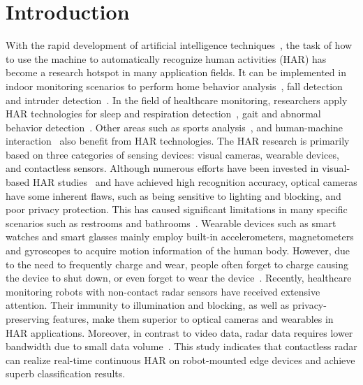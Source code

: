 \section{Introduction}
{W}{ith} the rapid development of artificial intelligence techniques~\cite{wang2019indoor,ali2023new,gu2022strokepeo,zhang2021rethinking,gu2024automatic}, the task of how to use the machine to automatically recognize human activities (HAR) has become a research hotspot in many application fields. It can be implemented in indoor monitoring scenarios to perform home behavior analysis~\cite{arab2022convolutional}, fall detection~\cite{jin2022mmfall} and intruder detection~\cite{ali2023new, rambabu2019iot}. 
In the field of healthcare monitoring, researchers apply HAR technologies for sleep and respiration detection~\cite{khan2017deep,zhao2020heart}, gait and abnormal behavior detection~\cite{hannink2016sensor}. 
Other areas such as sports analysis~\cite{hsu2018human}, and human-machine interaction~\cite{reily2018skeleton} also benefit from HAR technologies. 
The HAR research is primarily based on three categories of sensing devices: visual cameras, wearable devices, and contactless sensors. 
Although numerous efforts have been invested in visual-based HAR studies~\cite{singh2019human} and have achieved high recognition accuracy, optical cameras have some inherent flaws, such as being sensitive to lighting and blocking, and poor privacy protection. This has caused significant limitations in many specific scenarios such as restrooms and bathrooms~\cite{gurbuz2019radar}. 
Wearable devices such as smart watches and smart glasses mainly employ built-in accelerometers, magnetometers and gyroscopes to acquire motion information of the human body. 
However, due to the need to frequently charge and wear, people often forget to charge causing the device to shut down, or even forget to wear the device~\cite{lara2012survey}. 
Recently, healthcare monitoring robots with non-contact radar sensors have received extensive attention. 
Their immunity to illumination and blocking, as well as privacy-preserving features, make them superior to optical cameras and wearables in HAR applications. 
Moreover, in contrast to video data, radar data requires lower bandwidth due to small data volume~\cite{li2019survey,zhang2023survey}. 
This study indicates that contactless radar can realize real-time continuous HAR on robot-mounted edge devices and achieve superb classification results. 

